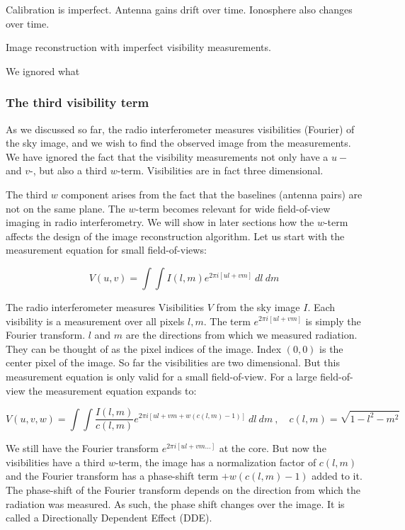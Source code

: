 Calibration is imperfect. Antenna gains drift over time. Ionosphere also changes over time.

Image reconstruction with imperfect visibility measurements.

We ignored what

\subsubsection{The third visibility term}
As we discussed so far, the radio interferometer measures visibilities (Fourier) of the sky image, and we wish to find the observed image from the measurements. We have ignored the fact that the visibility measurements not only have a $u-$ and $v$-, but also a third $w$-term. Visibilities are in fact three dimensional.

The third $w$ component arises from the fact that the baselines (antenna pairs) are not on the same plane. The $w$-term becomes relevant for wide field-of-view imaging in radio interferometry. We will show in later sections how the $w$-term affects the design of the image reconstruction algorithm. Let us start with the measurement equation for small field-of-views:

\begin{equation}\label{intro2:model:smallfov}
V(u, v) = \int\int I(l, m)  e^{2 \pi i [ul+vm]} \: dl \: dm
\end{equation}

The radio interferometer measures Visibilities $V$ from the sky image $I$. Each visibility is a measurement over all pixels $l, m$. The term $ e^{2 \pi i [ul+vm]}$ is simply the Fourier transform. $l$ and $m$ are the directions from which we measured radiation. They can be thought of as the pixel indices of the image. Index $(0,0)$ is the center pixel of the image. So far the visibilities are two dimensional. But this measurement equation is only valid for a small field-of-view. For a large field-of-view the measurement equation expands to:

\begin{equation}\label{intro2:model:widefov}
V(u, v, w) = \int\int  \frac{I(l, m)}{c(l, m)}  e^{2 \pi i [ul+vm + w(c(l, m) - 1)]} \: dl \: dm \:,  \quad c(l,m) = \sqrt{1 - l^2 - m ^2}
\end{equation} 

We still have the Fourier transform $ e^{2 \pi i [ul+vm \ldots]}$ at the core. But now the visibilities have a third $w$-term, the image has a normalization factor of $c(l, m)$ and the Fourier transform has a phase-shift term $+ w(c(l, m) - 1)$ added to it. The phase-shift of the Fourier transform depends on the direction from which the radiation was measured. As such, the phase shift changes over the image. It is called a Directionally Dependent Effect (DDE).

